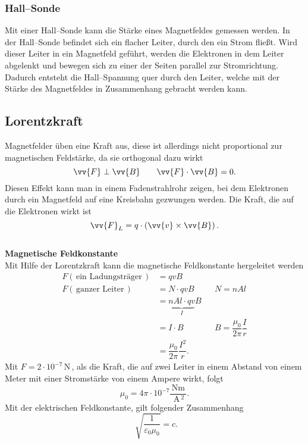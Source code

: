 \documentclass[a4paper,12pt]{article}
\begin{document}
\subsubsection{Hall--Sonde}
Mit einer Hall--Sonde kann die Stärke eines Magnetfeldes gemessen werden. In der Hall--Sonde befindet sich ein flacher Leiter, durch den ein Strom fließt. Wird dieser Leiter in ein Magnetfeld geführt, werden die Elektronen in dem Leiter abgelenkt und bewegen sich zu einer der Seiten parallel zur Stromrichtung. Dadurch entsteht die Hall--Spannung quer durch den Leiter, welche mit der Stärke des Magnetfeldes in Zusammenhang gebracht werden kann.

\subsection{Lorentzkraft}
Magnetfelder üben eine Kraft aus, diese ist allerdings nicht proportional zur magnetischen Feldstärke, da sie orthogonal dazu wirkt
\[ 
        \vv{F}\perp \vv{B}\qquad \vv{F}\cdot \vv{B}=0
.\] 
Diesen Effekt kann man in einem Fadenstrahlrohr zeigen, bei dem Elektronen durch ein Magnetfeld auf eine Kreisbahn gezwungen werden. Die Kraft, die auf die Elektronen wirkt ist
\[ 
        \vv{F}_L=q\cdot \left(\vv{v}\times \vv{B}\right)
.\]
\hfill\\\textbf{Magnetische Feldkonstante}\\ 
Mit Hilfe der Lorentzkraft kann die magnetische Feldkonstante hergeleitet werden
\begin{align*}
        F\left(\,\text{ein Ladungsträger}\,\right)&=qvB&&\\
        F\left(\,\text{ganzer Leiter}\,\right)&=N\cdot qvB&&N=nAl\\
                                              &=\underbrace{nAl\cdot qv}_{I}B&&\\
                                              &=I\cdot B&&B=\dfrac{\mu _0}{2\pi }\dfrac{I}{r}\\
                                              &=\dfrac{\mu _0}{2\pi }\dfrac{I^2}{r}
.\end{align*}
Mit $F=2\cdot 10^{-7}\,\text{N}\,$, als die Kraft, die auf zwei Leiter in einem Abstand von einem Meter mit einer Stromstärke von einem Ampere wirkt, folgt
\[ 
        \mu _0=4\pi \cdot 10^{-7}\dfrac{\,\text{Nm}\,}{\,\text{A}\,^2}
.\] 
\indent Mit der elektrischen Feldkonstante, gilt folgender Zusammenhang
\[ 
        \,\sqrt[]{\dfrac{1}{\varepsilon _0\mu _0}}=c
.\] 
\end{document}
